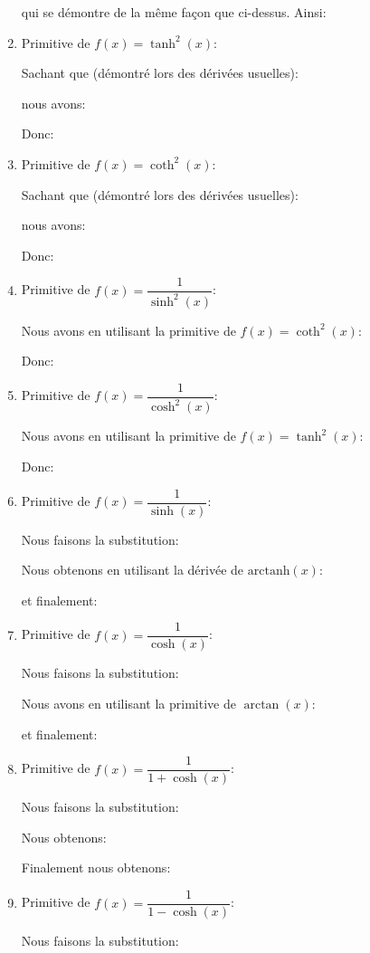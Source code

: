 \begin{enumerate}
		qui se démontre de la même façon que ci-dessus. Ainsi:
		
		
		\item Primitive de $f(x)=\tanh^2(x)$:
		
		Sachant que (démontré lors des dérivées usuelles):
		
		nous avons:
		
		Donc:
		
		
		\item Primitive de $f(x)=\coth^2(x)$:
		
		Sachant que (démontré lors des dérivées usuelles):
		
		nous avons:
		
		Donc:
		
		
		\item Primitive de $f(x)=\dfrac{1}{\sinh^2(x)}$:
		
		Nous avons en utilisant la primitive de  $f(x)=\coth^2(x)$:
		
		Donc:
		
		
		\item Primitive de $f(x)=\dfrac{1}{\cosh^2(x)}$:
		
		Nous avons en utilisant la primitive de $f(x)=\tanh^2(x)$:
		
		Donc:
		
		
		\item Primitive de $f(x)=\dfrac{1}{\sinh(x)}$:
		
		Nous faisons la substitution: 
		
		Nous obtenons en utilisant la dérivée de $\text{arctanh}(x)$:
		
		
		et finalement:
		
		
		\item Primitive de $f(x)=\dfrac{1}{\cosh(x)}$:
		
		Nous faisons la substitution:
		
		Nous avons en utilisant la primitive de $\arctan(x)$:
		
		et finalement:
		
		
		\item Primitive de $f(x)=\dfrac{1}{1+\cosh(x)}$:
		
		Nous faisons la substitution:
		
		Nous obtenons:
		
		Finalement nous obtenons:
		
		
		\item Primitive de $f(x)=\dfrac{1}{1-\cosh(x)}$:
		
		Nous faisons la substitution: 
		

\end{enumerate}
